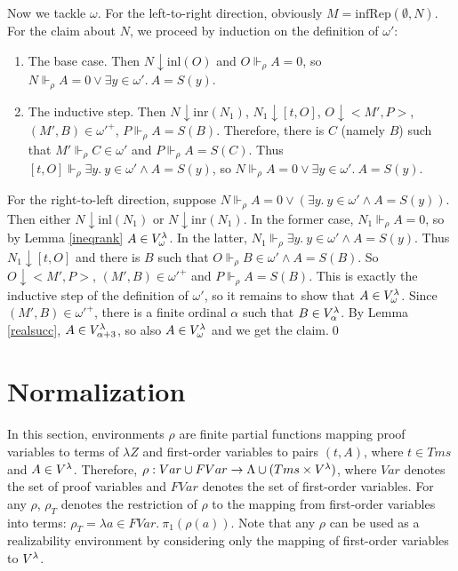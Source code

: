 \documentclass{LMCS}
\newcommand\reals{\ensuremath{\Vdash}}
\newcommand{\pl}[1]{\ensuremath{\mathrm{#1}}}
\newcommand{\INL}{\pl{inl}}
\newcommand{\INR}{\pl{inr}}
\newcommand{\la}{\lambda Z}
\begin{document}
Now we tackle $\omega$. For the left-to-right direction, obviously $M =
\pl{infRep}(\emptyset, N)$. For the claim about $N$, we proceed by induction on the
definition of $\omega'$:
\begin{enumerate}[$\bullet$]
\item The base case. Then $N \downarrow \INL(O)$ and $O \reals_\rho A = 0$, so $N
\reals_\rho A = 0 \lor \exists y \in \omega'.\ A = S(y)$. 
\item The inductive step. Then $N \downarrow \INR(N_1)$, $N_1 \downarrow [t, O]$,
$O \downarrow <M', P>$, $(M', B) \in \omega'^+$, $P \reals_\rho A = S(B)$.
Therefore, there is $C$ (namely $B$) such that $M' \reals_\rho C \in \omega'$ and $P
\reals_\rho A = S(C)$. Thus $[t, O] \reals_\rho \exists y.\ y \in
\omega' \land A = S(y)$, so $N \reals_\rho A = 0 \lor \exists y \in \omega'.\ A = S(y)$. 
\end{enumerate}
For the right-to-left direction, suppose $N \reals_\rho A = 0 \lor (\exists y.\ y \in
\omega'\land A = S(y))$. Then either $N \downarrow
\INL(N_1)$ or $N \downarrow \INR(N_1)$. In the former case, $N_1 \reals_\rho A =
0$, so by Lemma \ref{ineqrank} $A \in V^{\lambda}_\omega$. In the latter, $N_1 \reals_\rho\exists y.\ y \in
\omega' \land A = S(y)$. Thus $N_1 \downarrow [t, O]$ and there is $B$ such that $O
\reals_\rho B \in \omega' \land A = S(B)$. So $O
\downarrow <M', P>$, $(M', B) \in \omega'^+$ and $P \reals_\rho A =
S(B)$. This is exactly the inductive step of the
definition of $\omega'$, so it remains to show that $A \in
V^{\lambda}_\omega$. Since $(M', B) \in \omega'^+$, there is a finite ordinal
$\alpha$ such that $B \in V^{\lambda}_\alpha$. By Lemma \ref{realsucc}, $A \in
V^{\lambda}_{\alpha + 3}$, so also $A \in V^{\lambda}_\omega$ and we get the claim.\qed


\section{Normalization}\label{sectionnorm}

In this section, environments $\rho$ are finite partial functions mapping 
proof variables to terms of $\la$ and first-order variables to pairs $(t,
A)$, where $t \in Tms$ and $A \in V^{\lambda}$. Therefore, $\rho : Var \cup FVar \to
\Lambda \cup (Tms \times V^{\lambda})$, where $Var$ denotes the set of proof variables
and $FVar$ denotes the set of first-order variables. For any $\rho$,
$\rho_T$ denotes the restriction of $\rho$ to the mapping from first-order
variables into terms: $\rho_T = \lambda a \in FVar.\ \pi_1(\rho(a))$.  
Note that any $\rho$ can be used as a realizability environment by considering
only the mapping of first-order variables to $V^{\lambda}$. 
\end{document}
